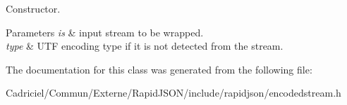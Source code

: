Constructor. 


\begin{DoxyParams}{Parameters}
{\em is} & input stream to be wrapped. \\
\hline
{\em type} & U\+TF encoding type if it is not detected from the stream. \\
\hline
\end{DoxyParams}


The documentation for this class was generated from the following file\+:\begin{DoxyCompactItemize}
\item 
Cadriciel/\+Commun/\+Externe/\+Rapid\+J\+S\+O\+N/include/rapidjson/encodedstream.\+h\end{DoxyCompactItemize}
